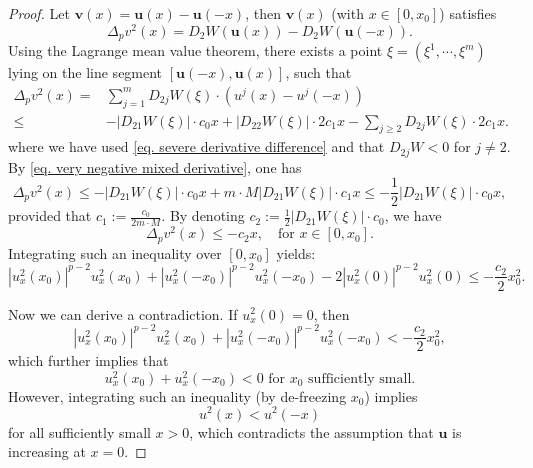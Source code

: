 \documentclass[11pt,twoside,reqno]{amsart}
\newcounter{assu}
\numberwithin{equation}{section}
\begin{document}
\begin{proof}
    Let $\mathbf{v}(x)=\mathbf{u}(x)-\mathbf{u}(-x)$, then $\mathbf{v}(x)$ (with $x\in[0,x_{0}]$) satisfies
    \begin{equation*}
        \Delta_{p}v^{2}(x)=D_{2}W(\mathbf{u}(x))-D_{2}W(\mathbf{u}(-x)).
    \end{equation*}
    Using the Lagrange mean value theorem, there exists a point $\xi=(\xi^{1},\cdots,\xi^{m})$ lying on the line segment $[\mathbf{u}(-x),\mathbf{u}(x)]$, such that
    \begin{align*}
        \Delta_{p}v^{2}(x)=&\sum_{j=1}^{m}D_{2j}W(\xi)\cdot(u^{j}(x)-u^{j}(-x))\\
        \leq&-|D_{21}W(\xi)|\cdot c_{0}x+|D_{22}W(\xi)|\cdot2c_{1}x-\sum_{j\geq2}D_{2j}W(\xi)\cdot2c_{1}x.
    \end{align*}
    where we have used \eqref{eq. severe derivative difference} and that $D_{2j}W<0$ for $j\neq2$. By \eqref{eq. very negative mixed derivative}, one has
    \begin{equation*}
        \Delta_{p}v^{2}(x)\leq-|D_{21}W(\xi)|\cdot c_{0}x+m\cdot M|D_{21}W(\xi)|\cdot c_{1}x\leq-\frac{1}{2}|D_{21}W(\xi)|\cdot c_{0}x,
    \end{equation*}
    provided that $\displaystyle c_{1}:=\frac{c_{0}}{2m\cdot M}$. By denoting $c_{2}:=\frac{1}{2}|D_{21}W(\xi)|\cdot c_{0}$, we have
    \begin{equation*}
        \Delta_{p}v^{2}(x)\leq-c_{2}x,\quad\mbox{for }x\in[0,x_{0}].
    \end{equation*}
    Integrating such an inequality over $[0,x_{0}]$ yields:
    \begin{equation*}
        |u^{2}_{x}(x_{0})|^{p-2}u^{2}_{x}(x_{0})+|u^{2}_{x}(-x_{0})|^{p-2}u^{2}_{x}(-x_{0})-2|u^{2}_{x}(0)|^{p-2}u^{2}_{x}(0)\leq-\frac{c_{2}}{2}x_{0}^{2}.
    \end{equation*}
    
    Now we can derive a contradiction. If $u^{2}_{x}(0)=0$, then
    \begin{equation*}
        |u^{2}_{x}(x_{0})|^{p-2}u^{2}_{x}(x_{0})+|u^{2}_{x}(-x_{0})|^{p-2}u^{2}_{x}(-x_{0})<-\frac{c_{2}}{2}x_{0}^{2},
    \end{equation*}
    which further implies that
    \begin{equation*}
        u^{2}_{x}(x_{0})+u^{2}_{x}(-x_{0})<0\mbox{ for }x_{0}\mbox{ sufficiently small}.
    \end{equation*}
    However, integrating such an inequality (by de-freezing $x_{0}$) implies $$u^{2}(x)<u^{2}(-x)$$ for all sufficiently small $x>0$, which contradicts the assumption that $\mathbf{u}$ is increasing at $x=0$.
\end{proof}
\end{document}
